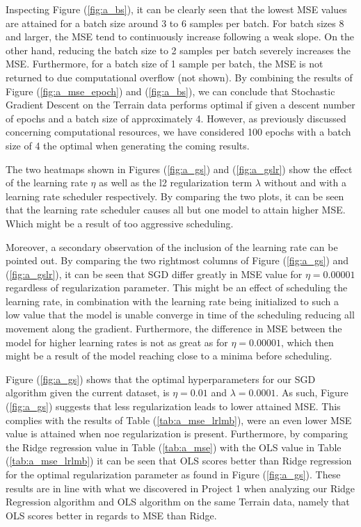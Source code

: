 \documentclass
[twocolumn,
secnumarabic,
nobibnotes,
aps,
prl,
reprint,
groupedaddress,
amsmath,
amssymb
]{revtex4-2}
\begin{document}
Inspecting Figure (\ref{fig:a_bs}), it can be clearly seen that the lowest MSE values are attained for a batch size around 3 to 6 samples per batch. For batch sizes 8 and larger, the MSE tend to continuously increase following a weak slope. On the other hand, reducing the batch size to 2 samples per batch severely increases the MSE. Furthermore, for a batch size of 1 sample per batch, the MSE is not returned to due computational overflow (not shown). By combining the results of Figure (\ref{fig:a_mse_epoch}) and (\ref{fig:a_bs}), we can conclude that Stochastic Gradient Descent on the Terrain data performs optimal if given a descent number of epochs and a batch size of approximately 4. However, as previously discussed concerning computational resources, we have considered 100 epochs with a batch size of 4 the optimal when generating the coming results.

The two heatmaps shown in Figures (\ref{fig:a_gs}) and (\ref{fig:a_gslr}) show the effect of the learning rate $\eta$ as well as the l2 regularization term $\lambda$ without and with a learning rate scheduler respectively. By comparing the two plots, it can be seen that the learning rate scheduler causes all but one model to attain higher MSE. Which might be a result of too aggressive scheduling.

Moreover, a secondary observation of the inclusion of the learning rate can be pointed out. By comparing the two rightmost columns of Figure (\ref{fig:a_gs}) and (\ref{fig:a_gslr}), it can be seen that SGD differ greatly in MSE value for $\eta=0.00001$ regardless of regularization parameter. This might be an effect of scheduling the learning rate, in combination with the learning rate being initialized to such a low value that the model is unable converge in time of the scheduling reducing all movement along the gradient. Furthermore, the difference in MSE between the model for higher learning rates is not as great as for $\eta = 0.00001$, which then might be a result of the model reaching close to a minima before scheduling.

Figure (\ref{fig:a_gs}) shows that the optimal hyperparameters for our SGD algorithm given the current dataset, is $\eta = 0.01$ and $\lambda = 0.0001$. As such, Figure (\ref{fig:a_gs}) suggests that less regularization leads to lower attained MSE. This complies with the results of Table (\ref{tab:a_mse_lrlmb}), were an even lower MSE value is attained when noe regularization is present. Furthermore, by comparing the Ridge regression value in Table (\ref{tab:a_mse}) with the OLS value in Table (\ref{tab:a_mse_lrlmb}) it can be seen that OLS scores better than Ridge regression for the optimal regularization parameter as found in Figure (\ref{fig:a_gs}). These results are in line with what we discovered in Project 1 when analyzing our Ridge Regression algorithm and OLS algorithm on the same Terrain data, namely that OLS scores better in regards to MSE than Ridge.
\end{document}
